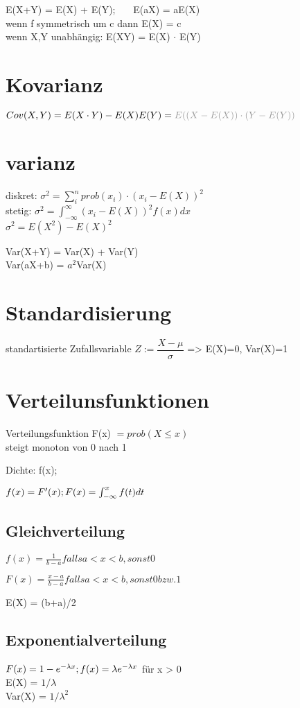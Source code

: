 E(X+Y) = E(X) + E(Y);~~~ E(aX) = aE(X) \\
wenn f symmetrisch um c dann E(X) = c\\
wenn X,Y unabhängig: E(XY) = E(X) $\cdot$ E(Y)

\section*{Kovarianz}
$Cov(X,Y) = E(X \cdot Y) -E(X)E(Y)= \gray{E((X-E(X))\cdot(Y-E(Y)) }$

\section*{varianz}
diskret: $ \sigma^2 = \sum_i^n prob(x_i)\cdot (x_i -E(X))^2$\\
stetig: $ \sigma^2 = \int_{-\infty}^{\infty} (x_i -E(X))^2 f(x) dx$ \\
$\sigma^2 = E(X^2) - E(X)^2$

Var(X+Y) = Var(X) + Var(Y) \\
Var(aX+b) = $a^2$Var(X)


\section*{Standardisierung}
standartisierte Zufallsvariable $Z:=\dfrac{X-\mu}{\sigma}$ => E(X)=0, Var(X)=1


\section*{Verteilunsfunktionen}
Verteilungsfunktion F(x) $= prob(X \leq x)$\\
steigt monoton von 0 nach 1

Dichte: f(x);

$f(x) = F'(x); \\
 F(x) = \int_{-\infty}^xf(t)dt$

\subsection*{Gleichverteilung}
$f(x) = \frac{1}{b-a} falls a < x < b, sonst 0$

$F(x)  = \frac{x-a}{b-a} falls a < x < b, sonst 0 bzw. 1$

E(X) = (b+a)/2

\subsection*{Exponentialverteilung}
$F(x) = 1 - e^{-\lambda x};  \\ f(x) = \lambda e^{-\lambda x}$ für x > 0 \\
E(X) = $1/\lambda$ \\
Var(X) = $1/\lambda^2$
